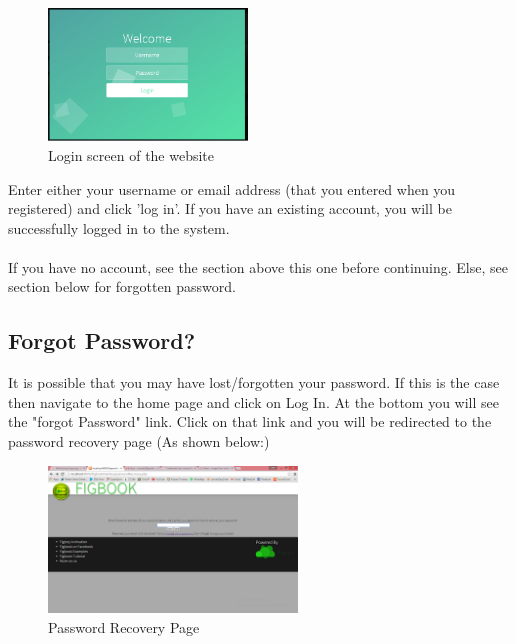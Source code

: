 \begin{figure}[h]
	\centering
	\includegraphics[width=200px]{images/login.png}
	\caption{Login screen of the website}
\end{figure}

\par{Enter either your username or email address (that you entered when you registered) and click 'log in'. If you have an existing account, you will be successfully logged in to the system.\\ \\ If you have no account, see the section above this one before continuing. Else, see section below for forgotten password.}
\\

\subsection{Forgot Password?}
\par{ It is possible that you may have lost/forgotten your password. If this is the case then navigate to the home page and click on Log In. At the bottom you will see the "forgot Password" link. Click on that link and you will be redirected to the password recovery page (As shown below:)}

\begin{figure}[h]
	\centering
	\includegraphics[width=250px]{images/passwordRecovery.png}
	\caption{Password Recovery Page}
\end{figure}

